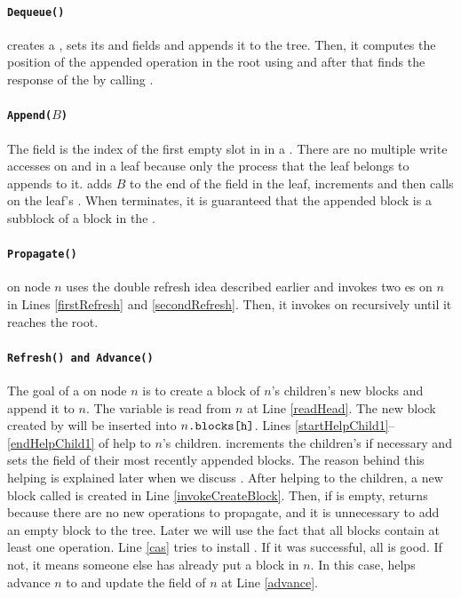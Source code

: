 \paragraph{\tt{Dequeue()}}
 creates a , sets its  and
 fields and appends it to the tree. Then, it computes
the position of the appended  operation in the root using
 and after that finds the response of the
 by calling . 

\paragraph{\tt{Append($B$)}}
The  field is the index of the first empty slot in
 in a . There are no multiple write accesses
on  and  in a leaf because only the process that
the leaf belongs to appends to it.  adds $B$ to the
end of the  field in the leaf, increments  and
then calls  on the leaf's . When
 terminates, it is guaranteed that the appended block is
a subblock of a block in the .  

\paragraph{\tt{Propagate()}}
 on node $n$ uses the double refresh idea described
earlier and invokes two es on $n$ in Lines
\ref{firstRefresh} and \ref{secondRefresh}. Then, it invokes
 on  recursively until it reaches the
root.  

\paragraph{\tt{Refresh()} and \tt{Advance()}}
The goal of a  on node $n$ is to create a block of $n$'s
children's new blocks and append it to $n$. The variable
 is read from $n$ at Line \ref{readHead}. The new
block created by  will be inserted into
$n{\normalfont{\texttt{.blocks[h]}}}$. Lines \ref{startHelpChild1}--\ref{endHelpChild1}
of  help to  $n$'s children. 
increments the children's  if necessary and sets the
 field of their most recently appended blocks. The reason
behind this helping is explained later when we discuss
. After helping to  the children, a new
block called  is created in Line
\ref{invokeCreateBlock}. Then, if  is empty, 
returns  because there are no new operations to propagate,
and it is unnecessary to add an empty block to the tree. Later we will
use the fact that all blocks contain at least one operation. Line
\ref{cas} tries to install . If it was successful, all is
good. If not, it means someone else has already put a block in
$n$. In this case,  helps advance
$n$ to  and update the  field of
$n$ at Line \ref{advance}. 


